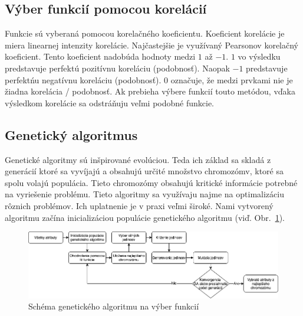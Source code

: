 \documentclass[runningheads]{llncs}
\begin{document}
\subsection{Výber funkcií pomocou korelácií}
Funkcie sú vyberaná pomocou korelačného koeficientu. Koeficient korelácie je miera linearnej intenzity 
korelácie. Najčastejšie je využívaný Pearsonov korelačný koeficient. Tento koeficient nadobúda hodnoty medzi
\begin{math}1\end{math} až \begin{math}-1\end{math}. \begin{math}1\end{math} vo výsledku predstavuje perfektú pozitívnu 
koreláciu (podobnosť). Naopak \begin{math}-1\end{math} predstavuje 
perfektńu negatívnu koreláciu (podobnosť). \begin{math}0\end{math} označuje, že medzi prvkami nie je žiadna korelácia / podobnosť.
Ak prebieha výbere funkcií touto metódou, vďaka výsledkom korelácie sa odstráňuju veľmi podobné funkcie.\cite{ref_xu}

\subsection{Genetický algoritmus}

Genetické algoritmy sú inšpirované evolúciou. Teda ich základ sa skladá z generácií ktoré sa vyvíjajú a obsahujú 
určité množstvo chromozómv, ktoré sa spolu volajú populácia. Tieto chromozómy obsahujú kritické informácie 
potrebné na vyriešenie problému. Tieto algoritmy sa využívaju najme na optimalizáciu rôznich
problémov. Ich uplatnenie je v praxi veľmi široké.\cite{ref_babatunde,ref_whitley} Nami vytvorený algoritmu začína 
inicializáciou populácie genetického algoritmu (viď. Obr.~\ref{fig_ga_rozdelenie}).

\begin{figure}
\includegraphics[width=\textwidth]{image/GA_alg.png}
\caption{Schéma genetického algoritmu na výber funkcií} \label{fig_ga_rozdelenie}
\end{figure}
    
\end{document}
